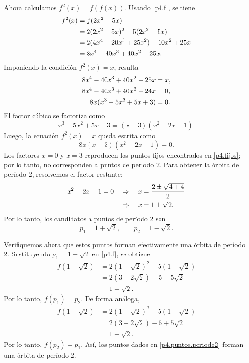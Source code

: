 \documentclass[12pt]{article}
\begin{document}
Ahora calculamos $f^2(x)=f(f(x))$. Usando \eqref{p4.f}, se tiene
\begin{align}
    f^2(x)
    &=f(2x^2-5x)\notag\\
    &=2(2x^2-5x)^2-5(2x^2-5x)\notag\\
    &=2(4x^4-20x^3+25x^2)-10x^2+25x\notag\\
    &=8x^4-40x^3+40x^2+25x.
\end{align}
Imponiendo la condición $f^2(x)=x$, resulta
\begin{align}
    8x^4-40x^3+40x^2+25x&=x,\notag\\
    8x^4-40x^3+40x^2+24x&=0,\notag\\
    8x(x^3-5x^2+5x+3)&=0.
\end{align}
El factor cúbico se factoriza como
\begin{equation*}
    x^3-5x^2+5x+3=(x-3)(x^2-2x-1).
\end{equation*}
Luego, la ecuación $f^2(x)=x$ queda escrita como
\begin{equation}\label{p4.factorizacion}
    8x(x-3)(x^2-2x-1)=0.
\end{equation}
Los factores $x=0$ y $x=3$ reproducen los puntos fijos encontrados en \eqref{p4.fijos}; por lo tanto, no corresponden a puntos de período $2$. Para obtener la órbita de período $2$, resolvemos el factor restante:
\begin{align}
    x^2-2x-1=0
    \quad &\Rightarrow \quad
    x=\frac{2\pm\sqrt{4+4}}{2}\notag\\
    &\Rightarrow \quad
    x=1\pm\sqrt{2}.
\end{align}
Por lo tanto, los candidatos a puntos de período $2$ son
\begin{equation}\label{p4.puntos.periodo2}
    p_1=1+\sqrt{2},
    \qquad
    p_2=1-\sqrt{2}.
\end{equation}

Verifiquemos ahora que estos puntos forman efectivamente una órbita de período $2$. Sustituyendo $p_1=1+\sqrt{2}$ en \eqref{p4.f}, se obtiene
\begin{align*}
    f(1+\sqrt{2})
    &=2(1+\sqrt{2})^2-5(1+\sqrt{2})\\
    &=2(3+2\sqrt{2})-5-5\sqrt{2}\\
    &=1-\sqrt{2}.
\end{align*}
Por lo tanto, $f(p_1)=p_2$. De forma análoga,
\begin{align*}
    f(1-\sqrt{2})
    &=2(1-\sqrt{2})^2-5(1-\sqrt{2})\\
    &=2(3-2\sqrt{2})-5+5\sqrt{2}\\
    &=1+\sqrt{2}.
\end{align*}
Por lo tanto, $f(p_2)=p_1$. Así, los puntos dados en \eqref{p4.puntos.periodo2} forman una órbita de período $2$.
\end{document}
